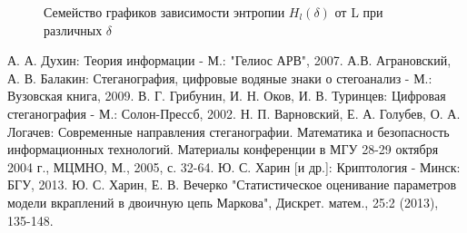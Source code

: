 \documentclass[a4paper,12pt]{article}
\theoremstyle{plain}
\begin{document}
							\begin{figure}[h]
								\caption{Семейство графиков зависимости энтропии $H_l{(\delta)}$ от L при различных $\delta$}
								\label{ris:"h_l.png"}
							\end{figure}
						
						
						
					


\clearpage




\begin{thebibliography}{0}
	А. А. Духин: Теория информации - М.: "Гелиос АРВ", 2007.
	А.В. Аграновский, А. В. Балакин: Стеганография, цифровые водяные знаки о стегоанализ - М.: Вузовская книга, 2009.
	 В. Г. Грибунин, И. Н. Оков, И. В. Туринцев: Цифровая стеганография - М.: Солон-Прессб, 2002.
	Н. П. Варновский, Е. А. Голубев, О. А. Логачев: Современные направления стеганографии. Математика и безопасность информационных технологий. Материалы конференции в МГУ 28-29 октября 2004 г., МЦМНО, М., 2005, с. 32-64.
	Ю. С. Харин [и др.]: Криптология - Минск: БГУ, 2013.
	Ю. С. Харин, Е. В. Вечерко "Статистическое оценивание параметров модели вкраплений в двоичную цепь Маркова", Дискрет. матем., 25:2 (2013), 135-148.
\end{thebibliography}
\end{document}
